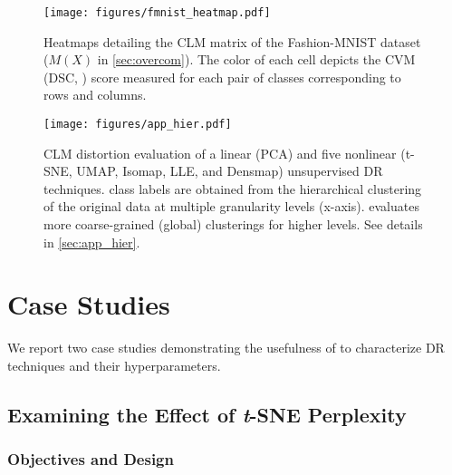 
\begin{figure}[t]
    \centering
    \texttt{[image: figures/fmnist\_heatmap.pdf]} \vspace{-6mm}
    \caption{Heatmaps detailing the CLM matrix of the Fashion-MNIST dataset ($M(X)$ in \autoref{sec:overcom}). The color of each cell depicts the CVM (DSC, \CHb{}) score measured for each pair of classes corresponding to rows and columns. \vspace{-2mm}}
    \label{fig:app_pp_heatmap}
\end{figure}



\begin{figure*}[t]
    \centering
    \texttt{[image: figures/app\_hier.pdf]}
    \vspace{-6mm}
    \caption{
    CLM distortion evaluation of a linear (PCA) and five nonlinear (t-SNE, UMAP, Isomap, LLE, and Densmap) unsupervised DR techniques.  class labels are obtained from the hierarchical clustering of the original data at multiple granularity levels (x-axis). \ltc evaluates more coarse-grained (global) clusterings for higher levels. See details in \autoref{sec:app_hier}. 
    \vspace{-3mm}}
    \label{fig:app_hier}
\end{figure*}


\section{Case Studies}

We report two case studies demonstrating the usefulness of \ltc to characterize DR techniques and their hyperparameters. 


\subsection{Examining the Effect of \textbf{\textit{t}}-SNE Perplexity}

\label{sec:apptsne}

\subsubsection{Objectives and Design}

